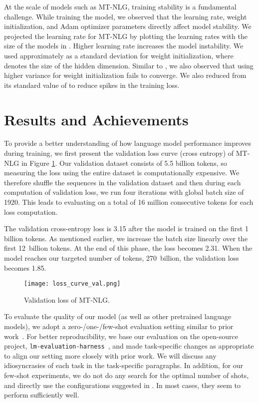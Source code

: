 \documentclass[11pt]{article}
\newcommand{\ours}{MT-NLG}
\begin{document}
At the scale of models such as {\ours}, training stability is a fundamental challenge. While training the model, we observed that the learning rate, weight initialization, and Adam optimizer parameters directly affect model stability. We projected the learning rate for {\ours} by plotting the learning rates with the size of the models in \cite{brown2020language}. Higher 
learning rate increases the model instability. We used approximately  as a standard deviation for weight initialization, where  denotes the size of the hidden dimension. Similar to \cite{DBLP:journals/corr/abs-1910-05895}, we also observed that using higher variance for weight initialization fails to converge. We also reduced  from its standard value of  to reduce spikes in the training loss. 



\section{Results and Achievements}
\label{sec:results}

To provide a better understanding of how language model performance improves during training, we first present the validation loss curve (cross entropy) of {\ours} in Figure \ref{fig:loss_curve}. Our validation dataset consists of 5.5 billion tokens, so measuring the loss using the entire dataset is computationally expensive. We therefore shuffle the sequences in the validation dataset and then during each computation of validation loss, we run four iterations with global batch size of 1920. This leads to evaluating on a total of 16 million consecutive tokens for each loss computation.


The validation cross-entropy loss is 3.15 after the model is trained on the first 1 billion tokens. As mentioned earlier, we increase the batch size linearly over the first 12~billion tokens. At the end of this phase, the loss becomes 2.31. When the model reaches our targeted number of tokens, 270~billion, the validation loss becomes 1.85. 


\begin{figure}
    \centering
    \texttt{[image: loss\_curve\_val.png]}
    \caption{Validation loss of {\ours}.}
    \label{fig:loss_curve}
\end{figure}


To evaluate the quality of our model (as well as other pretrained language models), we adopt a zero-/one-/few-shot evaluation setting similar to prior work~\citep{brown2020language,Rae2021Gopher}. For better reproducibility, we base our evaluation on the open-source project, {\texttt {lm-evaluation-harness}}~\citep{eval-harness}, and made task-specific changes as appropriate to align our setting more closely with prior work. We will discuss any idiosyncrasies of each task in the task-specific paragraphs. In addition, for our few-shot experiments, we do not do any search for the optimal number of shots, and directly use the configurations suggested in \cite{brown2020language}. In most cases, they seem to perform sufficiently well.
\end{document}

